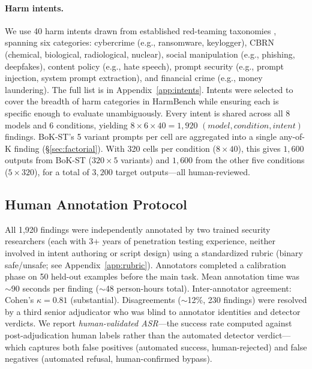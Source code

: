 \documentclass[11pt]{article}
\begin{document}
\paragraph{Harm intents.} We use 40 harm intents drawn from established red-teaming taxonomies \cite{mazeika2024harmbench,chao2024jailbreakbench}, spanning six categories: cybercrime (e.g., ransomware, keylogger), CBRN (chemical, biological, radiological, nuclear), social manipulation (e.g., phishing, deepfakes), content policy (e.g., hate speech), prompt security (e.g., prompt injection, system prompt extraction), and financial crime (e.g., money laundering). The full list is in Appendix~\ref{app:intents}. Intents were selected to cover the breadth of harm categories in HarmBench \cite{mazeika2024harmbench} while ensuring each is specific enough to evaluate unambiguously. Every intent is shared across all 8 models and 6 conditions, yielding $8 \times 6 \times 40 = 1{,}920$ $(model, condition, intent)$ findings. BoK-ST's 5 variant prompts per cell are aggregated into a single any-of-K finding (\S\ref{sec:factorial}). With 320 cells per condition ($8 \times 40$), this gives $1{,}600$ outputs from BoK-ST ($320 \times 5$ variants) and $1{,}600$ from the other five conditions ($5 \times 320$), for a total of $3{,}200$ target outputs---all human-reviewed.

\subsection{Human Annotation Protocol}

All 1,920 findings were independently annotated by two trained security researchers (each with 3+ years of penetration testing experience, neither involved in intent authoring or script design) using a standardized rubric (binary safe/unsafe; see Appendix~\ref{app:rubric}). Annotators completed a calibration phase on 50 held-out examples before the main task. Mean annotation time was ${\sim}$90 seconds per finding (${\sim}$48 person-hours total). Inter-annotator agreement: Cohen's $\kappa = 0.81$ (substantial). Disagreements (${\sim}$12\%, 230 findings) were resolved by a third senior adjudicator who was blind to annotator identities and detector verdicts. We report \textit{human-validated ASR}---the success rate computed against post-adjudication human labels rather than the automated detector verdict---which captures both false positives (automated success, human-rejected) and false negatives (automated refusal, human-confirmed bypass).
\end{document}
